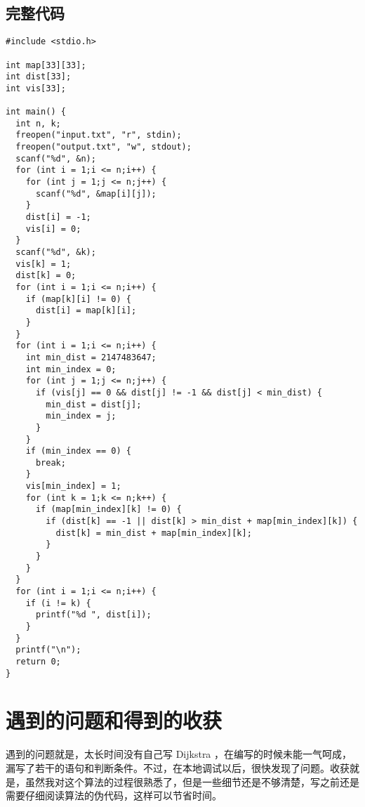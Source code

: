 \documentclass[11pt]{article}
\begin{document}
\subsection{完整代码}
\label{sec:orgac3b57e}
\begin{verbatim}
#include <stdio.h>

int map[33][33];
int dist[33];
int vis[33];

int main() {
  int n, k;
  freopen("input.txt", "r", stdin);
  freopen("output.txt", "w", stdout);
  scanf("%d", &n);
  for (int i = 1;i <= n;i++) {
    for (int j = 1;j <= n;j++) {
      scanf("%d", &map[i][j]);
    }
    dist[i] = -1;
    vis[i] = 0;
  }
  scanf("%d", &k);
  vis[k] = 1;
  dist[k] = 0;
  for (int i = 1;i <= n;i++) {
    if (map[k][i] != 0) {
      dist[i] = map[k][i];
    }
  }
  for (int i = 1;i <= n;i++) {
    int min_dist = 2147483647;
    int min_index = 0;
    for (int j = 1;j <= n;j++) {
      if (vis[j] == 0 && dist[j] != -1 && dist[j] < min_dist) {
        min_dist = dist[j];
        min_index = j;
      }
    }
    if (min_index == 0) {
      break;
    }
    vis[min_index] = 1;
    for (int k = 1;k <= n;k++) {
      if (map[min_index][k] != 0) {
        if (dist[k] == -1 || dist[k] > min_dist + map[min_index][k]) {
          dist[k] = min_dist + map[min_index][k];
        }
      }
    }
  }
  for (int i = 1;i <= n;i++) {
    if (i != k) {
      printf("%d ", dist[i]);
    }
  }
  printf("\n");
  return 0;
}
\end{verbatim}

\section{遇到的问题和得到的收获}
\label{sec:orgcdeaeb7}
遇到的问题就是，太长时间没有自己写 Dijkstra ，在编写的时候未能一气呵成，漏写了若干的语句和判断条件。不过，在本地调试以后，很快发现了问题。收获就是，虽然我对这个算法的过程很熟悉了，但是一些细节还是不够清楚，写之前还是需要仔细阅读算法的伪代码，这样可以节省时间。
\end{document}
